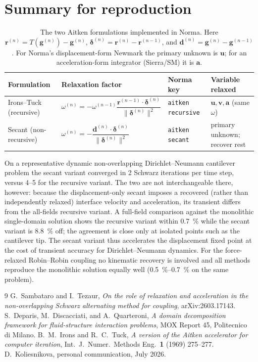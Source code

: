 \documentclass[11pt]{article}
\begin{document}
\section{Summary for reproduction}

\begin{table}[ht!]
\centering
\small
\begin{tabular}{@{}llll@{}}
\toprule
Formulation & Relaxation factor & Norma key & Variable relaxed \\
\midrule
Irons--Tuck (recursive) &
$\omega^{(n)} = -\omega^{(n-1)}\dfrac{\bm{r}^{(n-1)}\cdot\bm{\delta}^{(n)}}{\lVert\bm{\delta}^{(n)}\rVert^2}$ &
\texttt{aitken recursive} & $\bm{u},\bm{v},\bm{a}$ (same $\omega$) \\[1.4em]
Secant (non-recursive) &
$\omega^{(n)} = -\dfrac{\bm{d}^{(n)}\cdot\bm{\delta}^{(n)}}{\lVert\bm{\delta}^{(n)}\rVert^2}$ &
\texttt{aitken secant} & primary unknown; recover rest \\
\bottomrule
\end{tabular}
\caption{The two Aitken formulations implemented in Norma. Here
$\bm{r}^{(n)} = T(\bm{g}^{(n)}) - \bm{g}^{(n)}$,
$\bm{\delta}^{(n)} = \bm{r}^{(n)} - \bm{r}^{(n-1)}$, and
$\bm{d}^{(n)} = \bm{g}^{(n)} - \bm{g}^{(n-1)}$. For Norma's
displacement-form Newmark the primary unknown is $\bm{u}$; for an
acceleration-form integrator (Sierra/SM) it is $\bm{a}$.}
\end{table}

On a representative dynamic non-overlapping Dirichlet--Neumann cantilever
problem the secant variant converged in \num{2} Schwarz iterations per time
step, versus \numrange{4}{5} for the recursive variant. The two are not
interchangeable there, however: because the displacement-only secant imposes a
recovered (rather than independently relaxed) interface velocity and
acceleration, its transient differs from the all-fields recursive variant. A
full-field comparison against the monolithic single-domain solution shows the
recursive variant within \SI{0.7}{\percent} while the secant variant is
\SI{8.8}{\percent} off; the agreement is close only at isolated points such as
the cantilever tip. The secant variant thus accelerates the displacement
fixed point at the cost of transient accuracy for Dirichlet--Neumann dynamics.
For the force-relaxed Robin--Robin coupling no kinematic recovery
is involved and all methods reproduce the monolithic solution equally well
(\SI{0.5}{\percent}--\SI{0.7}{\percent} on the same problem).

\begin{thebibliography}{9}
 G.~Sambataro and I.~Tezaur,
\emph{On the role of relaxation and acceleration in the non-overlapping Schwarz
alternating method for coupling}, arXiv:2603.17143.
 S.~Deparis, M.~Discacciati, and A.~Quarteroni,
\emph{A domain decomposition framework for fluid-structure interaction
problems}, MOX Report 45, Politecnico di Milano.
 B.~M.~Irons and R.~C.~Tuck,
\emph{A version of the Aitken accelerator for computer iteration},
Int.\ J.\ Numer.\ Methods Eng.\ \textbf{1} (1969) 275--277.
 D.~Koliesnikova, personal communication, July 2026.
\end{thebibliography}
\end{document}
